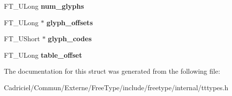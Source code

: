 \begin{DoxyCompactItemize}
\item 
\hypertarget{struct_t_t___s_bit___range_rec___afd9437150f8d9f784f98da6d61223464}{F\-T\-\_\-\-U\-Long {\bfseries num\-\_\-glyphs}}\label{struct_t_t___s_bit___range_rec___afd9437150f8d9f784f98da6d61223464}

\item 
\hypertarget{struct_t_t___s_bit___range_rec___a475f649f101b5886cc2443934e6aa9ca}{F\-T\-\_\-\-U\-Long $\ast$ {\bfseries glyph\-\_\-offsets}}\label{struct_t_t___s_bit___range_rec___a475f649f101b5886cc2443934e6aa9ca}

\item 
\hypertarget{struct_t_t___s_bit___range_rec___ad40d4aa7e48bdb4ab8c98850f1bba178}{F\-T\-\_\-\-U\-Short $\ast$ {\bfseries glyph\-\_\-codes}}\label{struct_t_t___s_bit___range_rec___ad40d4aa7e48bdb4ab8c98850f1bba178}

\item 
\hypertarget{struct_t_t___s_bit___range_rec___a54457937305b5ccf895f5b23c0cc6006}{F\-T\-\_\-\-U\-Long {\bfseries table\-\_\-offset}}\label{struct_t_t___s_bit___range_rec___a54457937305b5ccf895f5b23c0cc6006}

\end{DoxyCompactItemize}


The documentation for this struct was generated from the following file\-:\begin{DoxyCompactItemize}
\item 
Cadriciel/\-Commun/\-Externe/\-Free\-Type/include/freetype/internal/tttypes.\-h\end{DoxyCompactItemize}
